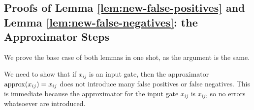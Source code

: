\subsection{Proofs of Lemma \ref{lem:new-false-positives} and Lemma \ref{lem:new-false-negatives}: the Approximator Steps}




We prove the base  case of  both lemmas in one shot, as the argument is the same.  

We need to show that if $x_{ij}$ is an input gate, then the approximator ${\rm approx}(x_{ij})=x_{ij}$ does not introduce many false positives or false negatives. 
%
This is immediate because the approximator for the input gate $x_{ij}$ is $x_{ij}$, so no errors whatsoever are introduced.  







% 
% 



